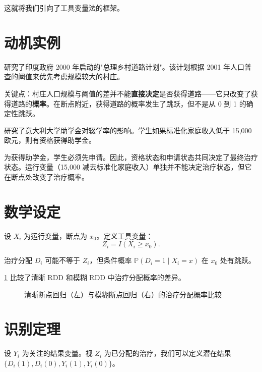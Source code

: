 这就将我们引向了工具变量法的框架。

\section{动机实例}

\begin{Example}[印度农村道路项目]\label{eg:indian-road-frdd}
\citet{asher2020rural} 研究了印度政府 2000 年启动的"总理乡村道路计划"。该计划根据 2001 年人口普查的阈值来优先考虑规模较大的村庄。

关键点：村庄人口规模与阈值的差并不能\textbf{直接决定}是否获得道路——它只改变了获得道路的\textbf{概率}。在断点附近，获得道路的概率发生了跳跃，但不是从 0 到 1 的确定性跳跃。
\end{Example}

\begin{Example}[意大利大学助学金项目]\label{eg:italian-university-frdd}
\citet{li2015evaluating} 研究了意大利大学助学金对辍学率的影响。学生如果标准化家庭收入低于 15,000 欧元，则有资格获得助学金。

为获得助学金，学生必须先申请。因此，资格状态和申请状态共同决定了最终治疗状态。运行变量（15,000 减去标准化家庭收入）单独并不能决定治疗状态，但它在断点处改变了治疗概率。
\end{Example}

\section{数学设定}

设 $X_i$ 为运行变量，断点为 $x_0$。定义工具变量：
\[
Z_i = I(X_i \geq x_0).
\label{eq:24-running-var}
\]

治疗分配 $D_i$ 可能不等于 $Z_i$，但条件概率 $\mathbb{P}(D_i = 1 \mid X_i = x)$ 在 $x_0$ 处有跳跃。

\cref{fig:frdd-treatment} 比较了清晰 RDD 和模糊 RDD 中治疗分配概率的差异。

\begin{figure}
\centering
\caption{清晰断点回归（左）与模糊断点回归（右）的治疗分配概率比较}\label{fig:frdd-treatment}
\end{figure}

\section{识别定理}

设 $Y_i$ 为关注的结果变量。视 $Z_i$ 为已分配的治疗，我们可以定义潜在结果 $\{D_i(1), D_i(0), Y_i(1), Y_i(0)\}$。

